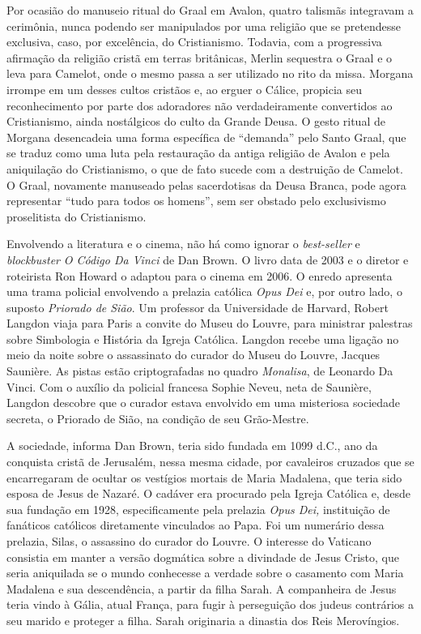 Por ocasião do manuseio ritual do Graal em Avalon, quatro talismãs
integravam a cerimônia, nunca podendo ser manipulados por uma religião
que se pretendesse exclusiva, caso, por excelência, do Cristianismo.
Todavia, com a progressiva afirmação da religião cristã em terras
britânicas, Merlin sequestra o Graal e o leva para Camelot, onde o
mesmo passa a ser utilizado no rito da missa. Morgana irrompe em um
desses cultos cristãos e, ao erguer o Cálice, propicia seu
reconhecimento por parte dos adoradores não verdadeiramente convertidos
ao Cristianismo, ainda nostálgicos do culto da Grande Deusa. O gesto
ritual de Morgana desencadeia uma forma específica de “demanda” pelo
Santo Graal, que se traduz como uma luta pela restauração da antiga
religião de Avalon e pela aniquilação do Cristianismo, o que de fato
sucede com a destruição de Camelot. O Graal, novamente manuseado pelas
sacerdotisas da Deusa Branca, pode agora representar “tudo para todos
os homens”, sem ser obstado pelo exclusivismo proselitista do
Cristianismo. 

Envolvendo a literatura e o cinema, não há como ignorar o
\textit{best-seller} e \textit{blockbuster} \textit{O Código Da Vinci}
de Dan Brown. O livro data de 2003 e o diretor e roteirista Ron Howard
o adaptou para o cinema em 2006. O enredo apresenta uma trama policial
envolvendo a prelazia católica \textit{Opus Dei} e, por outro lado, o
suposto \textit{Priorado de Sião}. Um professor da Universidade de
Harvard, Robert Langdon  viaja para Paris a convite do Museu do Louvre,
para ministrar palestras sobre Simbologia e História da Igreja
Católica. Langdon recebe uma ligação no meio da noite sobre o
assassinato do curador do Museu do Louvre, Jacques Saunière. As pistas
estão criptografadas no quadro \textit{Monalisa}, de Leonardo Da Vinci.
Com o auxílio da policial francesa Sophie Neveu, neta de Saunière,
Langdon descobre que o curador estava envolvido em uma misteriosa
sociedade secreta, o Priorado de Sião, na condição de seu Grão-Mestre.

A sociedade, informa Dan Brown, teria sido fundada em 1099 d.C., ano da
conquista cristã de Jerusalém, nessa mesma cidade, por cavaleiros
cruzados que se encarregaram de ocultar os vestígios mortais de Maria
Madalena, que teria sido esposa de Jesus de Nazaré. O cadáver era
procurado pela Igreja Católica e, desde sua fundação em 1928,
especificamente pela prelazia \textit{Opus Dei,} instituição de
fanáticos católicos diretamente vinculados ao Papa. Foi um numerário
dessa prelazia, Silas, o assassino do curador do Louvre. O interesse do
Vaticano consistia em manter a versão dogmática sobre a divindade de
Jesus Cristo, que seria aniquilada se o mundo conhecesse a verdade
sobre o casamento com Maria Madalena e sua descendência, a partir da
filha Sarah. A companheira de Jesus teria vindo à Gália, atual França,
para fugir à perseguição dos judeus contrários a seu marido e proteger
a filha. Sarah originaria a dinastia dos Reis Merovíngios. 

